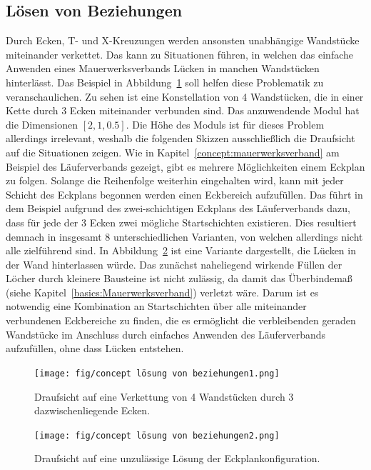 \subsection{Lösen von Beziehungen}
Durch Ecken, T- und X-Kreuzungen werden ansonsten unabhängige Wandstücke miteinander verkettet.
Das kann zu Situationen führen, in welchen das einfache Anwenden eines Mauerwerksverbands Lücken in manchen Wandstücken hinterlässt.
Das Beispiel in Abbildung~\ref{fig:concept:loesen_von_beziehungen1} soll helfen diese Problematik zu veranschaulichen.
Zu sehen ist eine Konstellation von 4 Wandstücken, die in einer Kette durch 3 Ecken miteinander verbunden sind.
Das anzuwendende Modul hat die Dimensionen \([2, 1, 0.5]\). 
Die Höhe des Moduls ist für dieses Problem allerdings irrelevant, weshalb die folgenden Skizzen ausschließlich die Draufsicht auf die Situationen zeigen.
Wie in Kapitel~\ref{concept:mauerwerksverband} am Beispiel des Läuferverbands gezeigt, gibt es mehrere Möglichkeiten einem Eckplan zu folgen.
Solange die Reihenfolge weiterhin eingehalten wird, kann mit jeder Schicht des Eckplans begonnen werden einen Eckbereich aufzufüllen.
Das führt in dem Beispiel aufgrund des zwei-schichtigen Eckplans des Läuferverbands dazu, dass für jede der 3 Ecken zwei mögliche Startschichten existieren.
Dies resultiert demnach in insgesamt 8 unterschiedlichen Varianten, von welchen allerdings nicht alle zielführend sind.
In Abbildung~\ref{fig:concept:loesen_von_beziehungen2} ist eine Variante dargestellt, die Lücken in der Wand hinterlassen würde.
Das zunächst naheliegend wirkende Füllen der Löcher durch kleinere Bausteine ist nicht zulässig, da damit das Überbindemaß (siehe Kapitel~\ref{basics:Mauerwerksverband}) verletzt wäre.
Darum ist es notwendig eine Kombination an Startschichten über alle miteinander verbundenen Eckbereiche zu finden, die es ermöglicht die verbleibenden geraden Wandstücke im Anschluss durch einfaches Anwenden des Läuferverbands aufzufüllen, ohne dass Lücken entstehen.

\begin{figure}[]
    \centering
    \texttt{[image: fig/concept lösung von beziehungen1.png]}
    \caption{Draufsicht auf eine Verkettung von 4 Wandstücken durch 3 dazwischenliegende Ecken.}
    \label{fig:concept:loesen_von_beziehungen1}
\end{figure}

\begin{figure}[]
    \centering
    \texttt{[image: fig/concept lösung von beziehungen2.png]}
    \caption{Draufsicht auf eine unzulässige Lösung der Eckplankonfiguration.}
    \label{fig:concept:loesen_von_beziehungen2}
\end{figure}


